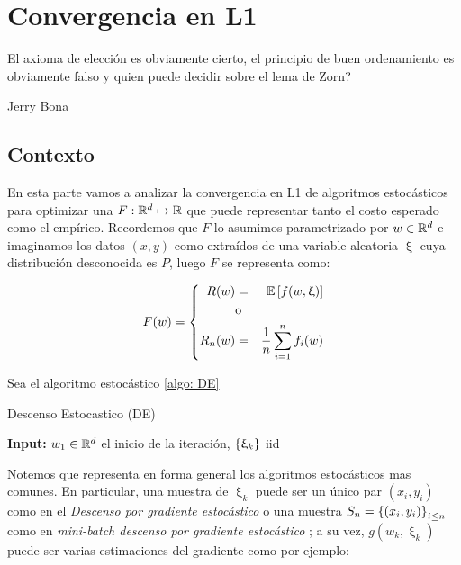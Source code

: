\chapter{Convergencia en L1}\label{ch:convergenciaL1}

\epigraph{El axioma de elecci\'on es obviamente cierto, el principio de buen ordenamiento es obviamente falso y quien puede decidir sobre el lema de Zorn?}{Jerry Bona}

\section{Contexto}

En esta parte vamos a analizar la convergencia en L1 de algoritmos estoc\'asticos para optimizar una $F: {\mathbb{R}}^d \mapsto {\mathbb{R}}$ que puede representar tanto el costo esperado como el emp\'irico. Recordemos que $F$ lo asumimos parametrizado por $w \in {\mathbb{R}}^d$ e imaginamos los datos $(x,y)$ como extra\'idos de una variable aleatoria $\upxi$ cuya distribuci\'on desconocida es $P$, luego $F$ se representa como:

\begin{equation}
F(w) = \left\lbrace
\begin{aligned}
R(w) & = & \mathbb{E} \left[f(w, \upxi)\right] \\
& \text{o} & \\
R_n(w) & = & \frac{1}{n} \sum\limits_{i=1}^{n} {f_i(w)}
\end{aligned}
\right.
\end{equation}

Sea el algoritmo estoc\'astico \ref{algo: DE}

\LinesNumbered
\begin{algorithm}[H]
	\caption{Descenso Estocastico (DE) \label{algo: DE}}
	\textbf{Input:} $w_1 \in {\mathbb{R}}^d$ el inicio de la iteraci\'on, $\left\lbrace\upxi_{k}\right\rbrace $ iid \\
\end{algorithm}

Notemos que representa en forma general los algoritmos estoc\'asticos mas comunes. En particular, una muestra de $\upxi_k$ puede ser un \'unico par $(x_i, y_i)$ como en el \textit{Descenso por gradiente estoc\'astico} o una muestra $S_n = \left\lbrace(x_i, y_i)\right\rbrace_{i \leq n}$ como en \textit{mini-batch descenso por gradiente estoc\'astico} ; a su vez, $g(w_k, \upxi_k)$ puede ser varias estimaciones del gradiente como por ejemplo:

